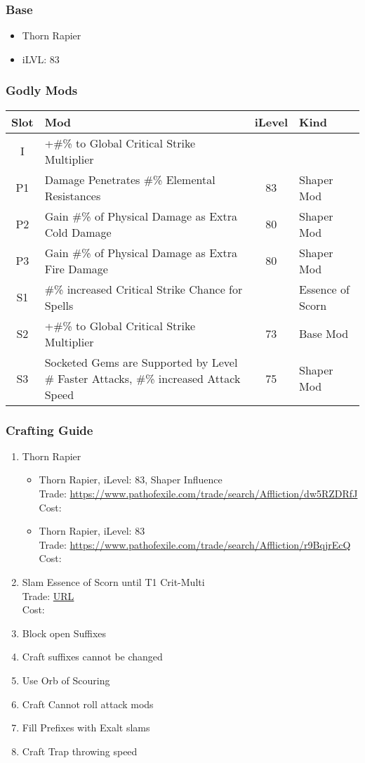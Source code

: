 \subsubsection{Base}
\begin{itemize}
	\item Thorn Rapier
	\item iLVL: 83
\end{itemize}

\subsubsection{Godly Mods}
\begin{tabular}{|c|l|c|l|}
	\hline
	Slot&Mod&iLevel&Kind\\\hline
	I& +\#\% to Global Critical Strike Multiplier&&\\\hline
	P1& Damage Penetrates \#\% Elemental Resistances&83& Shaper Mod \\\hline
	P2& Gain \#\% of Physical Damage as Extra Cold Damage&80& Shaper Mod \\\hline
	P3& Gain \#\% of Physical Damage as Extra Fire Damage&80& Shaper Mod \\\hline
	S1&\#\% increased Critical Strike Chance for Spells&&Essence of Scorn \\\hline
	S2&+\#\% to Global Critical Strike Multiplier&73&Base Mod \\\hline
	S3&Socketed Gems are Supported by Level \# Faster Attacks, \#\% increased Attack Speed&75&Shaper Mod \\\hline
\end{tabular}

\subsubsection{Crafting Guide}
\begin{enumerate}
	\item Thorn Rapier
	\begin{itemize}
		\item Thorn Rapier, iLevel: 83, Shaper Influence\\
		Trade: \url{https://www.pathofexile.com/trade/search/Affliction/dw5RZDRfJ}\\
		Cost: 
		\item Thorn Rapier, iLevel: 83\\
		Trade: \url{https://www.pathofexile.com/trade/search/Affliction/r9BqjrEcQ}\\
		Cost: 
	\end{itemize}
	\item Slam Essence of Scorn until T1 Crit-Multi\\
	Trade: \url{URL}\\
	Cost: 
	\item Block open Suffixes
	\item Craft suffixes cannot be changed
	\item Use Orb of Scouring
	\item Craft Cannot roll attack mods
	\item Fill Prefixes with Exalt slams
	\item Craft Trap throwing speed
\end{enumerate}

